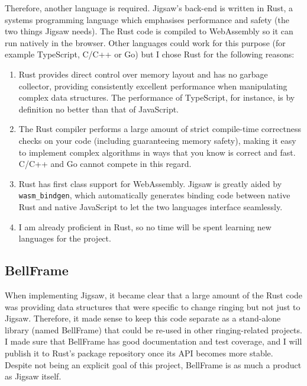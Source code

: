 \documentclass[12pt]{article}
\begin{document}
Therefore, another language is required.  Jigsaw's back-end is written in Rust, a systems
programming language which emphasises performance and safety (the two things Jigsaw needs).  The
Rust code is compiled to WebAssembly so it can run natively in the browser.  Other languages could
work for this purpose (for example TypeScript, C/C++ or Go) but I chose Rust for the following
reasons:

\begin{enumerate}
    \item Rust provides direct control over memory layout and has no garbage collector, providing
        consistently excellent performance when manipulating complex data structures.  The
        performance of TypeScript, for instance, is by definition no better than that of JavaScript.
    \item The Rust compiler performs a large amount of strict compile-time correctness checks on
        your code (including guaranteeing memory safety), making it easy to implement complex
        algorithms in ways that you know is correct and fast.  C/C++ and Go cannot compete in this
        regard.
    \item Rust has first class support for WebAssembly.  Jigsaw is greatly aided by
        \verb|wasm_bindgen|, which automatically generates binding code between native Rust and
        native JavaScript to let the two languages interface seamlessly.
    \item I am already proficient in Rust, so no time will be spent learning new languages for the
        project.
\end{enumerate}

\subsection{BellFrame}

When implementing Jigsaw, it became clear that a large amount of the Rust code was providing data
structures that were specific to change ringing but not just to Jigsaw.  Therefore, it made sense to
keep this code separate as a stand-alone library (named BellFrame) that could be re-used in other
ringing-related projects.  I made sure that BellFrame has good documentation and test coverage, and
I will publish it to Rust's package repository once its API becomes more stable.  Despite not being
an explicit goal of this project, BellFrame is as much a product as Jigsaw itself.



\pagebreak
\end{document}
